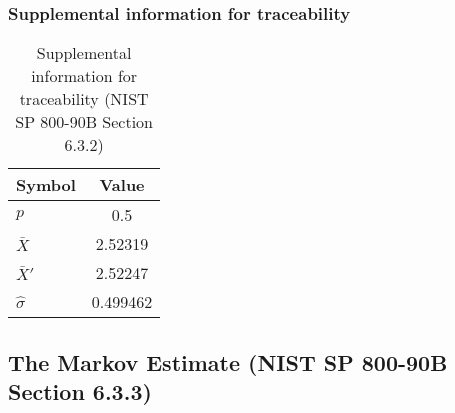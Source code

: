 \documentclass[a3paper,xelatex,english]{bxjsarticle}
\begin{document}
\subsubsection{Supplemental information for traceability}
\renewcommand{\arraystretch}{1.8}
\begin{table}[h]
\caption{Supplemental information for traceability (NIST SP 800-90B Section 6.3.2)}
\begin{center}
\begin{tabular}{|l|c|}
\hline 
\rowcolor{anotherlightblue} %
Symbol				& Value \\ \hline 
$p$				&      0.5\\ \hline 
$\bar{X}$ 		&  2.52319\\ \hline
$\bar{X}'$		&  2.52247\\ \hline
$\hat{\sigma}$		& 0.499462\\ \hline
\end{tabular}
\end{center}
\end{table}
\renewcommand{\arraystretch}{1.4}
\clearpage
\subsection{The Markov Estimate (NIST SP 800-90B Section 6.3.3)}\label{sec:Binary633}
\end{document}
